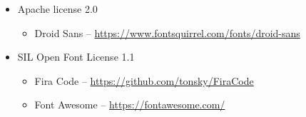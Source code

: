 \documentclass[hidelinks,titlepage,a4paper,twoside]{article}
\begin{document}
\begin{itemize}
\item Apache license 2.0
\begin{itemize}
\item Droid Sans -- \url{https://www.fontsquirrel.com/fonts/droid-sans}
\end{itemize}

\item SIL Open Font License 1.1
\begin{itemize}
\item Fira Code -- \url{https://github.com/tonsky/FiraCode}
\item Font Awesome -- \url{https://fontawesome.com/}
\end{itemize}

\end{itemize}



\end{document}
